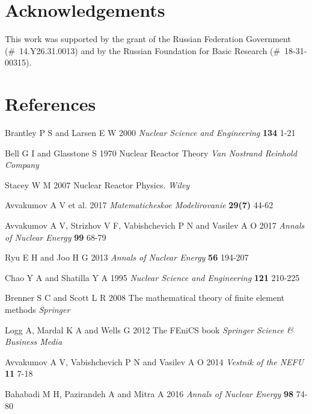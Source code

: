 \documentclass[a4paper]{jpconf}
\begin{document}
\section*{Acknowledgements}

This work was supported by the grant of the Russian Federation Government (\#~14.Y26.31.0013) and by the Russian Foundation for Basic Research (\#~18-31-00315).

\section*{References}
\begin{thebibliography}{9}
Brantley P S and Larsen E W 2000 {\it Nuclear Science and Engineering} {\bf 134} 1-21

Bell G I and Glasstone S 1970 Nuclear Reactor Theory {\it Van Nostrand Reinhold Company}

Stacey W M 2007 Nuclear Reactor Physics. {\it Wiley}

Avvakumov A V et al. 2017 {\it Matematicheskoe Modelirovanie} {\bf 29(7)} 44-62

Avvakumov A V, Strizhov V F, Vabishchevich P N and Vasilev A O 2017 {\it Annals of Nuclear Energy} {\bf 99} 68-79

Ryu E H and Joo H G 2013 {\it Annals of Nuclear Energy} {\bf 56} 194-207

Chao Y A and Shatilla Y A 1995 {\it Nuclear Science and Engineering} {\bf 121} 210-225

Brenner S C and Scott L R 2008 The mathematical theory of finite element
methods {\it Springer}

Logg A, Mardal K A and Wells G 2012 The FEniCS book {\it Springer Science \& Business Media}

Avvakumov A V, Vabishchevich P N and Vasilev A O 2014 {\it Vestnik
of the NEFU} {\bf 11} 7-18

Bahabadi M H, Pazirandeh A and Mitra A 2016 {\it Annals of Nuclear Energy} {\bf 98} 74-80

\end{thebibliography}
\end{document}

